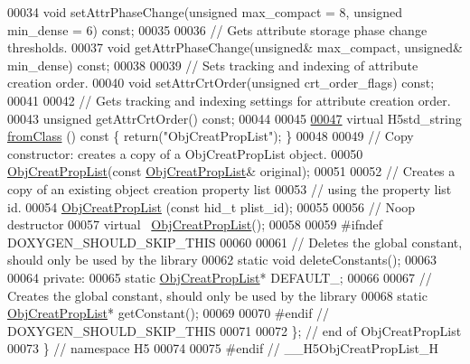 \begin{DoxyCode}
00034         \textcolor{keywordtype}{void} setAttrPhaseChange(\textcolor{keywordtype}{unsigned} max\_compact = 8, \textcolor{keywordtype}{unsigned} min\_dense = 6) \textcolor{keyword}{const};
00035 
00036         \textcolor{comment}{// Gets attribute storage phase change thresholds.}
00037         \textcolor{keywordtype}{void} getAttrPhaseChange(\textcolor{keywordtype}{unsigned}& max\_compact, \textcolor{keywordtype}{unsigned}& min\_dense) \textcolor{keyword}{const};
00038 
00039         \textcolor{comment}{// Sets tracking and indexing of attribute creation order.}
00040         \textcolor{keywordtype}{void} setAttrCrtOrder(\textcolor{keywordtype}{unsigned} crt\_order\_flags) \textcolor{keyword}{const};
00041 
00042         \textcolor{comment}{// Gets tracking and indexing settings for attribute creation order.}
00043         \textcolor{keywordtype}{unsigned} getAttrCrtOrder() \textcolor{keyword}{const};
00044 
00045 
\hyperlink{class_h5_1_1_obj_creat_prop_list_aa9e5e054947c19ae8eaab5e4e938fc2c}{00047}         \textcolor{keyword}{virtual} H5std\_string \hyperlink{class_h5_1_1_obj_creat_prop_list_aa9e5e054947c19ae8eaab5e4e938fc2c}{fromClass} ()\textcolor{keyword}{ const }\{ \textcolor{keywordflow}{return}(\textcolor{stringliteral}{"ObjCreatPropList"}); \}
00048 
00049         \textcolor{comment}{// Copy constructor: creates a copy of a ObjCreatPropList object.}
00050         \hyperlink{class_h5_1_1_obj_creat_prop_list}{ObjCreatPropList}(\textcolor{keyword}{const} \hyperlink{class_h5_1_1_obj_creat_prop_list}{ObjCreatPropList}& original);
00051 
00052         \textcolor{comment}{// Creates a copy of an existing object creation property list}
00053         \textcolor{comment}{// using the property list id.}
00054         \hyperlink{class_h5_1_1_obj_creat_prop_list}{ObjCreatPropList} (\textcolor{keyword}{const} hid\_t plist\_id);
00055 
00056         \textcolor{comment}{// Noop destructor}
00057         \textcolor{keyword}{virtual} ~\hyperlink{class_h5_1_1_obj_creat_prop_list}{ObjCreatPropList}();
00058 
00059 \textcolor{preprocessor}{#ifndef DOXYGEN\_SHOULD\_SKIP\_THIS}
00060 
00061         \textcolor{comment}{// Deletes the global constant, should only be used by the library}
00062         \textcolor{keyword}{static} \textcolor{keywordtype}{void} deleteConstants();
00063 
00064     \textcolor{keyword}{private}:
00065         \textcolor{keyword}{static} \hyperlink{class_h5_1_1_obj_creat_prop_list}{ObjCreatPropList}* DEFAULT\_;
00066 
00067         \textcolor{comment}{// Creates the global constant, should only be used by the library}
00068         \textcolor{keyword}{static} \hyperlink{class_h5_1_1_obj_creat_prop_list}{ObjCreatPropList}* getConstant();
00069 
00070 \textcolor{preprocessor}{#endif // DOXYGEN\_SHOULD\_SKIP\_THIS}
00071 
00072 \}; \textcolor{comment}{// end of ObjCreatPropList}
00073 \} \textcolor{comment}{// namespace H5}
00074 
00075 \textcolor{preprocessor}{#endif // \_\_H5ObjCreatPropList\_H}
\end{DoxyCode}
